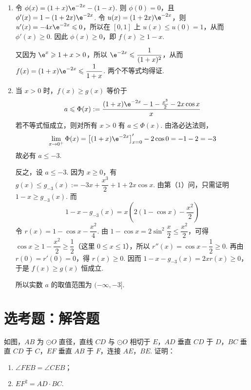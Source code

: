 \begin{solution}
\begin{enumerate}
\item 令 \(\phi(x)=(1+x)\e^{-2x}-(1-x)\). 则 \(\phi(0)=0\)，且 \(\phi'(x)=1-(1+2x)\e^{-2x}\). 令 \(u(x)=(1+2x)\e^{-2x}\)，则 \(u'(x)=-4x\e^{-2x}\leqslant0\)，所以在 \([0,1]\) 上 \(u(x)\leqslant u(0)=1\)，从而 \(\phi'(x)\geqslant0\). 因此 \(\phi(x)\geqslant0\)，即 \(f(x)\geqslant1-x\).

又因为 \(\e^x\geqslant1+x>0\)，所以 \(\e^{-2x}\leqslant\dfrac1{(1+x)^2}\)，从而 \(f(x)=(1+x)\e^{-2x}\leqslant\dfrac1{1+x}\). 两个不等式均得证.

\item 当 \(x>0\) 时，\(f(x)\geqslant g(x)\) 等价于
\[
a\leqslant\Phi(x):=\frac{(1+x)\e^{-2x}-1-\frac{x^3}{2}-2x\cos x}{x}
\]
若不等式恒成立，则对所有 \(x>0\) 有 \(a\leqslant\Phi(x)\). 由洛必达法则，
\[
\lim_{x\to0^+}\Phi(x)=\left[(1+x)\e^{-2x}\right]'_{x=0}-2\cos0=-1-2=-3
\]
故必有 \(a\leqslant-3\).

反之，设 \(a\leqslant-3\). 因为 \(x\geqslant0\)，有 \(g(x)\leqslant g_{-3}(x):=-3x+\dfrac{x^3}{2}+1+2x\cos x\). 由第（1）问，只需证明 \(1-x\geqslant g_{-3}(x)\). 而
\[
1-x-g_{-3}(x)=x\left(2(1-\cos x)-\frac{x^2}{2}\right)
\]
令 \(r(x)=1-\cos x-\dfrac{x^2}{4}\). 由 \(1-\cos x=2\sin^2\dfrac{x}{2}\leqslant\dfrac{x^2}{2}\)，可得 \(\cos x\geqslant1-\dfrac{x^2}{2}\geqslant\dfrac12\)（这里 \(0\leqslant x\leqslant1\)），所以 \(r''(x)=\cos x-\dfrac12\geqslant0\). 再由 \(r(0)=r'(0)=0\)，得 \(r(x)\geqslant0\). 因而 \(1-x-g_{-3}(x)=2xr(x)\geqslant0\)，于是 \(f(x)\geqslant g(x)\) 恒成立.

所以实数 \(a\) 的取值范围为 \((-\infty,-3]\).
\end{enumerate}
\end{solution}

\section{选考题：解答题}

\begin{problem}
如图，\(AB\) 为 \(\odot O\) 直径，直线 \(CD\) 与 \(\odot O\) 相切于 \(E\)，\(AD\) 垂直 \(CD\) 于 \(D\)，\(BC\) 垂直 \(CD\) 于 \(C\)，\(EF\) 垂直 \(AB\) 于 \(F\)，连接 \(AE\)，\(BE\). 证明：

\begin{enumerate}
\item \(\angle FEB = \angle CEB\)；
\item \(EF^2 = AD \cdot BC\).
\end{enumerate}

\end{problem}

